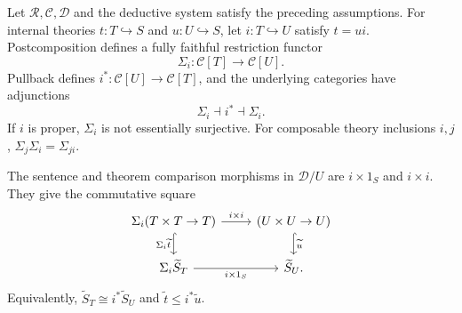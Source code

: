 \begin{theorem}
\label{thm:theory-extension}
Let $\mathscr R,\mathscr C,\mathcal D$ and the deductive system
satisfy the preceding assumptions. For internal theories
$t:T\hookrightarrow S$ and $u:U\hookrightarrow S$, let
$i:T\hookrightarrow U$ satisfy $t=ui$. Postcomposition defines a
fully faithful restriction functor
\[
 \Sigma_i:\mathscr C[T]\longrightarrow\mathscr C[U].
\]
Pullback defines $i^*:\mathscr C[U]\to\mathscr C[T]$, and the
underlying categories have adjunctions
\[
 \Sigma_i\dashv i^*\dashv\Sigma_i.
\]
If $i$ is proper, $\Sigma_i$ is not essentially surjective.
For composable theory inclusions $i,j$,
$\Sigma_j\Sigma_i=\Sigma_{ji}$.

The sentence and theorem comparison morphisms in $\mathcal D/U$
are $i\times1_S$ and $i\times i$. They give the commutative square
\[
\begin{tikzcd}
 \Sigma_i(T\times T\to T)
   \arrow[r,"i\times i"]\arrow[d,hook,"\Sigma_i\widetilde t"'] &
 (U\times U\to U)\arrow[d,hook,"\widetilde u"]\\
 \Sigma_i\widetilde S_T\arrow[r,"i\times1_S"'] & \widetilde S_U.
\end{tikzcd}
\]
Equivalently, $\widetilde S_T\cong i^*\widetilde S_U$ and
$\widetilde t\leq i^*\widetilde u$.
\end{theorem}
